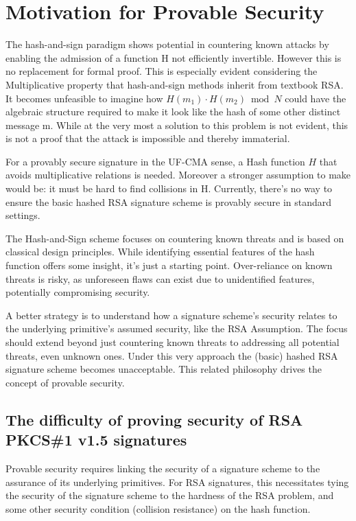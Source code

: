 \documentclass[]{final_report}
\theoremstyle{definition}
\begin{document}
\section{Motivation for Provable Security}
The hash-and-sign paradigm shows potential in countering known attacks by enabling the admission of a function H not efficiently invertible. However this is no replacement for formal proof. This is especially evident considering the Multiplicative property that hash-and-sign methods inherit from textbook RSA. It becomes unfeasible to imagine how $H(m_{1}) \cdot H(m_{2}) \bmod N$ could have the algebraic structure required to make it look like the hash of some other distinct message m. While at the very most a solution to this problem is not evident, this is not a proof that the attack is impossible and thereby immaterial.

For a provably secure signature in the UF-CMA sense, a Hash function \(H\) that avoids multiplicative relations is needed. Moreover a stronger assumption to make would be: it must be hard to find collisions in H. Currently, there's no way to ensure the basic hashed RSA signature scheme is provably secure in standard settings.

The Hash-and-Sign scheme focuses on countering known threats and is based on classical design principles. While identifying essential features of the hash function offers some insight, it's just a starting point. Over-reliance on known threats is risky, as unforeseen flaws can exist due to unidentified features, potentially compromising security.

A better strategy is to understand how a signature scheme's security relates to the underlying primitive's assumed security, like the RSA Assumption. The focus should extend beyond just countering known threats to addressing all potential threats, even unknown ones. Under this very approach the (basic) hashed RSA signature scheme becomes unacceptable. This related philosophy drives the concept of provable security.


\subsection{The difficulty of proving security of RSA PKCS\#1 v1.5 signatures}

Provable security requires linking the security of a signature scheme to the assurance of its underlying primitives. For RSA signatures, this necessitates tying the security of the signature scheme to the hardness of the RSA problem, and some other security condition (collision resistance) on the hash function.
\end{document}
